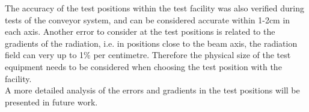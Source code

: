 The accuracy of the test positions within the test facility was also verified during tests of the conveyor system, and can be considered accurate within 1-2cm in each axis. Another error to consider at the test positions is related to the gradients of the radiation, i.e. in positions close to the beam axis, the radiation field can very up to 1\% per centimetre. Therefore the physical size of the test equipment needs to be considered when choosing the test position with the facility. \\

A more detailed analysis of the errors and gradients in the test positions will be presented in future work. \\
